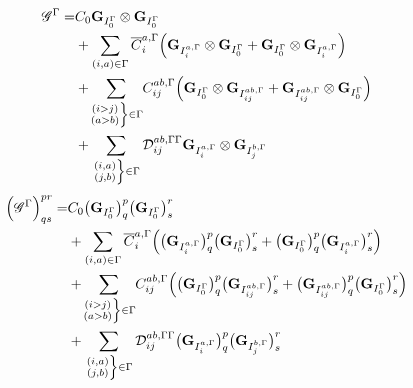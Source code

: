 \begin{equation}
  \begin{split}
    \bigG^\irp = &
    C_0 \matG_{I_0^\irp} \otimes \matG_{I_0^\irp}\\
    & + \sum_{(i,a) \in \irp} \overline{C}_i^{a,\irp}
    \Big(
        \matG_{I_i^{a,\irp}} \otimes \matG_{I_0^\irp}
        + \matG_{I_0^\irp} \otimes \matG_{I_i^{a,\irp}}
    \Big)\\
    & + \sumijabrestr C_{ij}^{ab, \irp}
    \Big(
        \matG_{I_0^\irp} \otimes \matG_{I_{ij}^{ab,\irp}}
        + \matG_{I_{ij}^{ab,\irp}} \otimes \matG_{I_0^\irp}
    \Big)\\
    & + \sumijabfull \Dmix_{ij}^{ab, \irp\irp}
    \matG_{I_i^{a,\irp}} \otimes \matG_{I_j^{b,\irp}}\\
  \end{split}
\end{equation}
\begin{equation}
  \begin{split}
    \Big(\bigG^\irp\Big)^{pr}_{qs} = &
    C_0 \big( \matG_{I_0^\irp} \big)^p_q \big( \matG_{I_0^\irp} \big)^r_s\\
    & + \sum_{(i,a) \in \irp} \overline{C}_i^{a,\irp}
    \Big(
        \big( \matG_{I_i^{a,\irp}} \big)^p_q \big( \matG_{I_0^\irp} \big)^r_s
        + \big( \matG_{I_0^\irp} \big)^p_q \big( \matG_{I_i^{a,\irp}} \big)^r_s
    \Big)\\
    & + \sumijabrestr C_{ij}^{ab, \irp}
    \Big(
        \big( \matG_{I_0^\irp} \big)^p_q \big( \matG_{I_{ij}^{ab,\irp}} \big)^r_s
        + \big( \matG_{I_{ij}^{ab,\irp}} \big)^p_q \big( \matG_{I_0^\irp} \big)^r_s
    \Big)\\
    & + \sumijabfull \Dmix_{ij}^{ab, \irp\irp}
    \big( \matG_{I_i^{a,\irp}} \big)^p_q \big( \matG_{I_j^{b,\irp}} \big)^r_s
  \end{split}
\end{equation}

